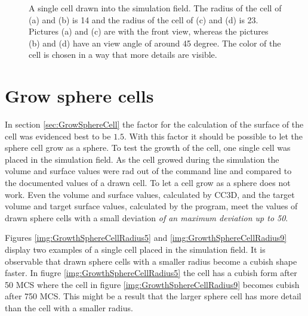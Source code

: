 \begin{figure}
\begin{center}
{	}
	\end{center}
	\caption{\label{img:DrawnSphereCellRadius14And23}A single cell drawn into the simulation field. The radius of the cell of (a) and (b) is 14 and the radius of the cell of (c) and (d) is 23. Pictures (a) and (c) are with the front view, whereas the
pictures (b) and (d) have an view angle of around 45 degree. The color of the cell is chosen in
a way that more details are visible.}
\end{figure}

\newpage
\section{Grow sphere cells}
In section \ref{sec:GrowSphereCell} the factor for the calculation of the surface of the cell was evidenced best to be $1.5$. With this factor it should be possible to let the sphere cell grow as a sphere. To test the growth of the cell, one single cell was placed in the simulation field. As the cell growed during the simulation the volume and surface values were rad out of the command line and compared to the documented values of a drawn cell. \newline
To let a cell grow as a sphere does not work. Even the volume and surface values, calculated by \ac{CC3D}, and the target volume and target surface values, calculated by the program, meet the values of drawn sphere cells with a small deviation \textit{of an maximum deviation up to 50}.

Figures \ref{img:GrowthSphereCellRadius5} and \ref{img:GrowthSphereCellRadius9} display two examples of a single cell placed in the simulation field. It is observable that drawn sphere cells with a smaller radius become a cubish shape faster. In fiugre \ref{img:GrowthSphereCellRadius5} the cell has a cubish form after 50 \ac{MCS} where the cell in figure \ref{img:GrowthSphereCellRadius9} becomes cubish after 750 \ac{MCS}. This might be a result that the larger sphere cell has more detail than the cell with a smaller radius.

